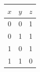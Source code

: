 \begin{tabular}{ccc}\toprule
\(x\)&\(y\)&\(z\)\\\midrule
0&0&1\\
0&1&1\\
1&0&1\\
1&1&0\\
\bottomrule\end{tabular}
